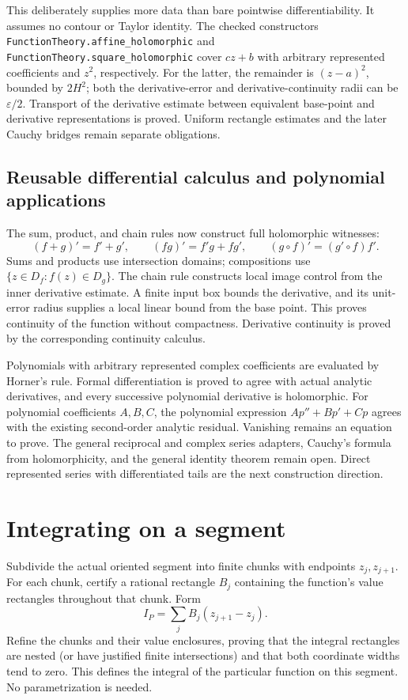 This deliberately supplies more data than bare pointwise differentiability.
It assumes no contour or Taylor identity. The checked constructors
\texttt{FunctionTheory.affine\_holomorphic} and
\texttt{FunctionTheory.square\_holomorphic} cover $cz+b$ with arbitrary
represented coefficients and $z^2$, respectively. For the latter, the
remainder is $(z-a)^2$, bounded by $2H^2$; both the derivative-error and
derivative-continuity radii can be $\varepsilon/2$. Transport of the derivative
estimate between equivalent base-point and derivative representations is
proved. Uniform rectangle estimates and the later Cauchy bridges remain
separate obligations.

\subsection{Reusable differential calculus and polynomial applications}
The sum, product, and chain rules now construct full holomorphic witnesses:
\[
 (f+g)'=f'+g',\qquad (fg)'=f'g+fg',\qquad
 (g\circ f)'=(g'\circ f)f'.
\]
Sums and products use intersection domains; compositions use
$\{z\in D_f:f(z)\in D_g\}$. The chain rule constructs local image control
from the inner derivative estimate. A finite input box bounds the derivative,
and its unit-error radius supplies a local linear bound from the base point. This proves
continuity of the function without compactness. Derivative continuity is
proved by the corresponding continuity calculus.

Polynomials with arbitrary represented complex coefficients are evaluated by
Horner's rule. Formal differentiation is proved to agree with actual analytic
derivatives, and every successive polynomial derivative is holomorphic.
For polynomial coefficients $A,B,C$, the polynomial expression
$Ap''+Bp'+Cp$ agrees with the existing second-order analytic residual.
Vanishing remains an equation to prove. The general reciprocal and complex
series adapters, Cauchy's formula from holomorphicity, and the general
identity theorem remain open. Direct represented series with differentiated
tails are the next construction direction.

\section{Integrating on a segment}
Subdivide the actual oriented segment into finite chunks with endpoints
$z_j,z_{j+1}$. For each chunk, certify a rational rectangle $B_j$
containing the function's value rectangles throughout that chunk. Form
\[
 I_P=\sum_j B_j(z_{j+1}-z_j).
\]
Refine the chunks and their value enclosures, proving that the integral
rectangles are nested (or have justified finite intersections) and that
both coordinate widths tend to zero. This defines the integral of the
particular function on this segment. No parametrization is needed.

